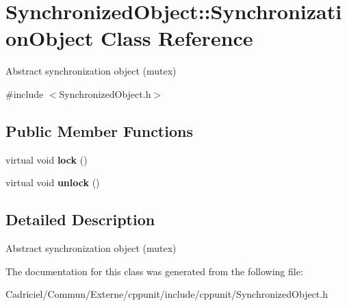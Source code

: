 \hypertarget{class_synchronized_object_1_1_synchronization_object}{}\section{Synchronized\+Object\+:\+:Synchronization\+Object Class Reference}
\label{class_synchronized_object_1_1_synchronization_object}


Abstract synchronization object (mutex)  




{\ttfamily \#include $<$Synchronized\+Object.\+h$>$}

\subsection*{Public Member Functions}
\begin{DoxyCompactItemize}
\item 
virtual void {\bfseries lock} ()\hypertarget{class_synchronized_object_1_1_synchronization_object_a2c1a4b7e3e3a8f8993140fb1fc9dabe0}{}\label{class_synchronized_object_1_1_synchronization_object_a2c1a4b7e3e3a8f8993140fb1fc9dabe0}

\item 
virtual void {\bfseries unlock} ()\hypertarget{class_synchronized_object_1_1_synchronization_object_a2af2a59901a0cdc673dc8729840fe797}{}\label{class_synchronized_object_1_1_synchronization_object_a2af2a59901a0cdc673dc8729840fe797}

\end{DoxyCompactItemize}


\subsection{Detailed Description}
Abstract synchronization object (mutex) 

The documentation for this class was generated from the following file\+:\begin{DoxyCompactItemize}
\item 
Cadriciel/\+Commun/\+Externe/cppunit/include/cppunit/Synchronized\+Object.\+h\end{DoxyCompactItemize}
